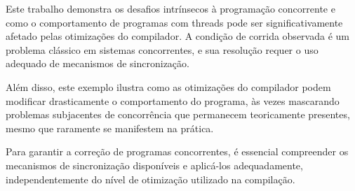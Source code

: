 \documentclass[12pt]{article}
\begin{document}
Este trabalho demonstra os desafios intrínsecos à programação concorrente e como o comportamento de programas com threads pode ser significativamente afetado pelas otimizações do compilador. A condição de corrida observada é um problema clássico em sistemas concorrentes, e sua resolução requer o uso adequado de mecanismos de sincronização.

Além disso, este exemplo ilustra como as otimizações do compilador podem modificar drasticamente o comportamento do programa, às vezes mascarando problemas subjacentes de concorrência que permanecem teoricamente presentes, mesmo que raramente se manifestem na prática.

Para garantir a correção de programas concorrentes, é essencial compreender os mecanismos de sincronização disponíveis e aplicá-los adequadamente, independentemente do nível de otimização utilizado na compilação.
\end{document}
